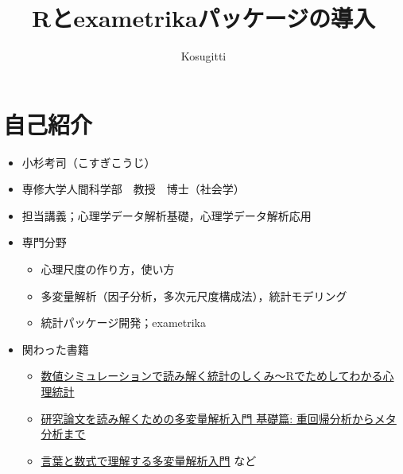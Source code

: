 \documentclass[
  a4paper,
]{ltjsbook}
\title{Rとexametrikaパッケージの導入}
\author{Kosugitti}
\date{}
\providecommand{\tightlist}{%
  \setlength{\itemsep}{0pt}\setlength{\parskip}{0pt}}\usepackage{longtable,booktabs,array}
\renewcommand*\contentsname{Table of contents}
\newcommand\contentsname{Table of contents}
\begin{document}
\maketitle

\renewcommand*\contentsname{Table of contents}
{
\hypersetup{linkcolor=}
\setcounter{tocdepth}{3}
\tableofcontents
}

\section{自己紹介}\label{ux81eaux5df1ux7d39ux4ecb}

\begin{itemize}
\tightlist
\item
  小杉考司（こすぎこうじ）
\item
  専修大学人間科学部　教授　博士（社会学）
\item
  担当講義；心理学データ解析基礎，心理学データ解析応用
\item
  専門分野

  \begin{itemize}
  \tightlist
  \item
    心理尺度の作り方，使い方
  \item
    多変量解析（因子分析，多次元尺度構成法），統計モデリング
  \item
    統計パッケージ開発；exametrika
  \end{itemize}
\item
  関わった書籍

  \begin{itemize}
  \tightlist
  \item
    \href{https://amzn.to/3XlA5Gq}{数値シミュレーションで読み解く統計のしくみ〜Rでためしてわかる心理統計}
  \item
    \href{https://amzn.to/3EWhLNY}{研究論文を読み解くための多変量解析入門
    基礎篇: 重回帰分析からメタ分析まで}
  \item
    \href{https://amzn.to/4gYB32u}{言葉と数式で理解する多変量解析入門}
    など
  \end{itemize}
\end{itemize}
\end{document}

